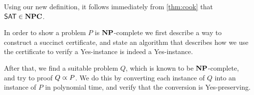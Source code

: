 \begin{corollary}
    Using our new definition, it follows immediately from \autoref{thm:cook} that $\mathsf{SAT} \in \mathbf{NPC}$.
\end{corollary}
\begin{strategy}
    In order to show a problem $P$ is $\mathbf{NP}$-complete we first describe a way to construct a succinct certificate,
    and state an algorithm that describes how we use the certificate to verify a Yes-instance is indeed a Yes-instance.

    After that, we find a suitable problem $Q$, which is known to be $\mathbf{NP}$-complete, and try to proof $Q \varpropto P$.
    We do this by converting each instance of $Q$ into an instance of $P$ in polynomial time, and verify that the conversion is Yes-preserving.
\end{strategy}

